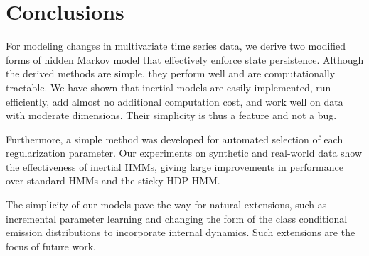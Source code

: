 \documentclass[letterpaper]{article}
\begin{document}
\section{Conclusions}

For modeling changes in multivariate time series data, we derive two modified forms of hidden Markov model that effectively enforce state persistence. Although the derived methods are simple, they perform well and are computationally tractable. We have shown that inertial models are easily implemented, run efficiently, add almost no additional computation cost, and work well on data with moderate dimensions. Their simplicity is thus a feature and not a bug. 

Furthermore, a simple method was developed for automated selection of each regularization parameter. Our experiments on synthetic and real-world data show the effectiveness of inertial HMMs, giving large improvements in performance over standard HMMs and the sticky HDP-HMM.

The simplicity of our models pave the way for natural extensions, such as incremental parameter learning and changing the form of the class conditional emission distributions to incorporate internal dynamics. Such extensions are the focus of future work.

\fontsize{9.5pt}{10.5pt}
\selectfont


\end{document}
